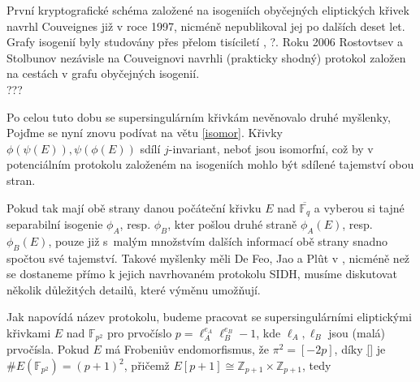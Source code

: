 \documentclass [12pt]{report}
\begin{document}

První kryptografické schéma založené na isogeniích obyčejných eliptických křivek navrhl Couveignes \cite{Couveignes} již v roce 1997, nicméně nepublikoval jej po dalších deset let. Grafy isogenií byly studovány přes přelom tisíciletí \cite{Galbraith}, ?. Roku 2006 Rostovtsev a Stolbunov \cite{Stolbunov} nezávisle na Couveignovi navrhli (prakticky shodný) protokol založen na cestách v grafu obyčejných isogenií.\\

???

Po celou tuto dobu se supersingulárním křivkám nevěnovalo druhé myšlenky,\\




Pojďme se nyní znovu podívat na větu \ref{isomor}.  Křivky $\phi (\psi (E)), \psi (\phi (E))$ sdílí $j$-invariant, neboť jsou isomorfní, což by v potenciálním protokolu založeném na isogeniích mohlo být sdílené tajemství obou stran. 

Pokud tak mají obě strany danou počáteční křivku $E$ nad $\overline{\mathbb{F}_q}$ a vyberou si tajné separabilní isogenie $\phi_A$, resp. $\phi_B$, kter pošlou druhé straně $\phi_A(E)$, resp. $\phi_B(E)$, pouze již s~malým množstvím dalších informací obě strany snadno spočtou své tajemství. Takové myšlenky měli De Feo, Jao a Plût v \cite{DeFeo3}, nicméně než se dostaneme přímo k jejich navrhovaném protokolu SIDH, musíme diskutovat několik důležitých detailů, které výměnu umožňují.\\

\begin{center} 
\end{center}

Jak napovídá název protokolu, budeme pracovat se supersingulárními eliptickými křivkami $E$ nad $\mathbb{F}_{p^2}$ pro prvočíslo $p = \ell_A ^{e_A} \ell_B ^{e_B} - 1$, kde $\ell_A,\ell_B$ jsou (malá) prvočísla. Pokud $E$ má Frobeniův endomorfismus, že $\pi^2 = [-2p]$, díky \ref{} je $\#E(\mathbb{F}_{p^2}) = (p+1)^2$, přičemž $E[p+1] \cong \mathbb{Z}_{p+1} \times \mathbb{Z}_{p+1}$, tedy \\
\end{document}
